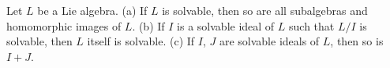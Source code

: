 Let $L$ be a Lie algebra.
(a) If $L$ is solvable, then so are all subalgebras and homomorphic images of $L$.
(b) If $I$ is a solvable ideal of $L$ such that $L/I$ is solvable, then $L$ itself is solvable.
(c) If $I$, $J$ are solvable ideals of $L$, then so is $I+J$.
